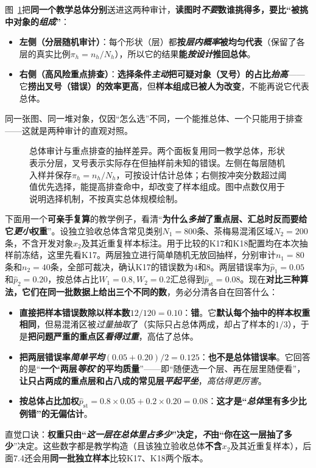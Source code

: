 图~\ref{fig:knowledge-quality-assessment-correction-audit-sampling}把\textbf{同一个教学总体}\textbf{分别}送进这两种审计，\textbf{读图时\emph{不要}数谁挑得多，要比“被挑中对象的\emph{组成}”}：
\begin{itemize}\item \textbf{左侧（分层随机审计）}：每个形状（层）都\textbf{按\emph{层内概率}被均匀代表}（保留了各层的真实比例$\pi_h=n_h/N_h$），所以它的结果\textbf{能\emph{按设计}推回总体}。\item \textbf{右侧（高风险重点排查）}：\textbf{选择条件\emph{主动}把可疑对象（叉号）的占比\emph{抬高}}——它\textbf{捞出叉号（错误）的效率更高}，但\textbf{样本组成已被人为改变}，不能再说它代表总体。\end{itemize}
同一张图、同一堆对象，仅因“怎么选”不同，一个能推总体、一个只能用于排查——这就是两种审计的直观对照。

\begin{figure}[htbp]
  \centering
  
  \caption{总体审计与重点排查的抽样差异。两个面板复用同一教学总体，形状表示分层，叉号表示实际存在但抽样前未知的错误。左侧在每层随机入样并保存$\pi_h=n_h/N_h$，可按设计估计总体；右侧按冲突分数超过阈值优先选择，能提高排查命中，却改变了样本组成。图中点数仅用于说明选择机制，不按真实总体规模绘制。}
  \label{fig:knowledge-quality-assessment-correction-audit-sampling}
\end{figure}

下面用一个\textbf{可亲手复算}的教学例子，看清“\textbf{为什么\emph{多抽}了重点层、汇总时反而要给它\emph{更小}权重}”。设独立验收总体含常见类别$N_1=800$条、茶梅易混淆区域$N_2=200$条，不含开发对象$x_2$及其近重复样本标注。用于比较的K17和K18配置均在本次抽样前冻结，这里先看K17。两层独立进行简单随机无放回抽样，分别审计$n_1=80$条和$n_2=40$条，全部可裁决，确认K17的错误数为$4$和$8$。两层错误率为$\widehat p_1=0.05$和$\widehat p_2=0.20$，按总体占比$W_1=0.8,W_2=0.2$汇总得到$\widehat p_{\mathrm{st}}=0.08$。现在\textbf{对比三种算法，它们在同一批数据上给出三个不同的数}，务必分清各自在回答什么：
\begin{itemize}\item \textbf{直接把样本错误数除以样本数}$12/120=0.10$：\textbf{错}。它\textbf{默认每个抽中的样本权重相同}，但易混淆区被\emph{过量抽取}了（实际只占总体两成，却占了样本的$1/3$），于是\textbf{把问题严重的重点区\emph{看得过重}}，高估了总体。\item \textbf{把两层错误率\emph{简单平均}}$(0.05+0.20)/2=0.125$：\textbf{也不是总体错误率}。它回答的是“\textbf{一个‘两层\emph{等权}’的平均质量}”——即“随便选一个层、再在层里随便看”，\textbf{让只占两成的重点层和占八成的常见层\emph{平起平坐}}，\emph{高估得更厉害}。\item \textbf{按总体占比加权}$\widehat p_{\mathrm{st}}=0.8\times0.05+0.2\times0.20=0.08$：\textbf{这才是“\emph{总体}里有多少比例错”的无偏估计}。\end{itemize}
直觉口诀：\textbf{权重只由“\emph{这一层在总体里占多少}”决定，\emph{不}由“你在这一层抽了多少}”决定。这些数字都是教学构造（且该独立验收总体\textbf{不含}$x_2$及其近重复样本），后面7.4还会用\textbf{同一批独立样本}比较K17、K18两个版本。

